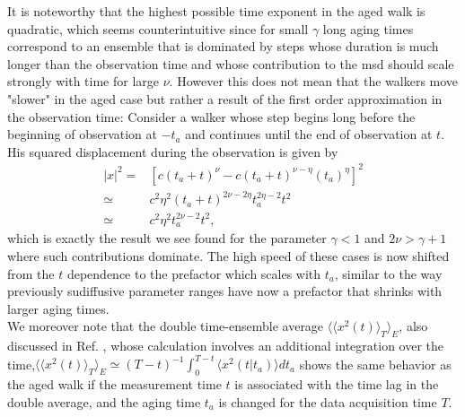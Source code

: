 It is noteworthy that the highest possible time exponent in the aged walk is quadratic, which seems counterintuitive since for small $\gamma$ long aging times correspond to an ensemble that is dominated by steps whose duration is much longer than the observation time and whose contribution to the \gls{msd} should scale strongly with time for large $\nu$. However this does not mean that the walkers move "slower" in the aged case but rather a result of the first order approximation in the observation time: Consider a walker whose step begins long before the beginning of observation at $-t_a$ and continues until the end of observation at $t$. His squared displacement during the observation is given by
%
\begin{align}
|x|^2 =& [c (t_a+t)^{\nu} - c (t_a+t)^{\nu-\eta} (t_a)^{\eta} ]^2\\
\simeq & c^2 \eta^2  (t_a+t)^{2\nu-2\eta} t_a^{2 \eta -2} t^2 \\
\simeq & c^2 \eta^2 t_a^{2 \nu -2} t^2 ,
\end{align}
%
which is exactly the result we see found for the parameter $\gamma <1$ and $2\nu > \gamma+1$ where such contributions dominate. The high speed of these cases is now shifted from the $t$ dependence to the prefactor which scales with $t_a$, similar to the way previously sudiffusive parameter ranges have now a prefactor that shrinks with larger aging times.\\

We moreover note that the double time-ensemble average $\langle \langle x^2 (t) \rangle_T \rangle_E$, also discussed in Ref. \cite{radons2018}, whose calculation involves an additional integration over the time,$\langle \langle x^2 (t) \rangle_T \rangle_E \simeq (T-t)^{-1} \int_0^{T-t} \langle x^2 (t|t_a) \rangle dt_a$  shows the same behavior as the aged walk if the measurement time $t$ is associated with the time lag in the double average, and the aging time $t_a$ is changed for the data acquisition time $T$.   \\


